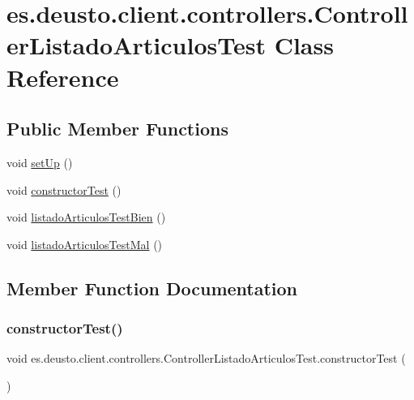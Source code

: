 \hypertarget{classes_1_1deusto_1_1client_1_1controllers_1_1_controller_listado_articulos_test}{}\section{es.\+deusto.\+client.\+controllers.\+Controller\+Listado\+Articulos\+Test Class Reference}
\label{classes_1_1deusto_1_1client_1_1controllers_1_1_controller_listado_articulos_test}
\subsection*{Public Member Functions}
\begin{DoxyCompactItemize}
\item 
void \mbox{\hyperlink{classes_1_1deusto_1_1client_1_1controllers_1_1_controller_listado_articulos_test_a5f9ddb5f3c61e1384f76afa0557ed64a}{set\+Up}} ()
\item 
void \mbox{\hyperlink{classes_1_1deusto_1_1client_1_1controllers_1_1_controller_listado_articulos_test_a80d538326f2f0ca5f0048da1b0c1ccb8}{constructor\+Test}} ()
\item 
void \mbox{\hyperlink{classes_1_1deusto_1_1client_1_1controllers_1_1_controller_listado_articulos_test_a3a37ce40203b972f4e0b0a8c568e333e}{listado\+Articulos\+Test\+Bien}} ()
\item 
void \mbox{\hyperlink{classes_1_1deusto_1_1client_1_1controllers_1_1_controller_listado_articulos_test_af30da4b61ace1aee11eab8d495bb945d}{listado\+Articulos\+Test\+Mal}} ()
\end{DoxyCompactItemize}


\subsection{Member Function Documentation}
\mbox{\label{classes_1_1deusto_1_1client_1_1controllers_1_1_controller_listado_articulos_test_a80d538326f2f0ca5f0048da1b0c1ccb8}} 
\subsubsection{\texorpdfstring{constructorTest()}{constructorTest()}}
{\footnotesize\ttfamily void es.\+deusto.\+client.\+controllers.\+Controller\+Listado\+Articulos\+Test.\+constructor\+Test (\begin{DoxyParamCaption}{ }\end{DoxyParamCaption})}

